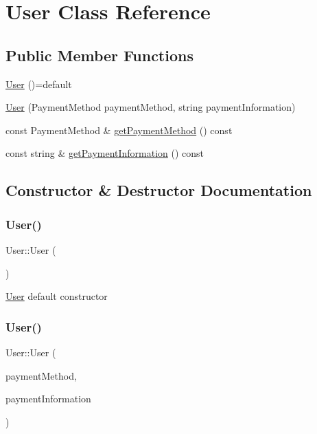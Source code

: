 \hypertarget{class_user}{}\section{User Class Reference}
\label{class_user}
\subsection*{Public Member Functions}
\begin{DoxyCompactItemize}
\item 
\mbox{\hyperlink{class_user_a4dd5fde1b81bb132994a67f27bc203d1}{User}} ()=default
\item 
\mbox{\hyperlink{class_user_ad4a962e2a4725118c5ea7a5af8362a66}{User}} (Payment\+Method payment\+Method, string payment\+Information)
\item 
const Payment\+Method \& \mbox{\hyperlink{class_user_a7945c31f5147c86e9577a8500ac51b8e}{get\+Payment\+Method}} () const
\item 
const string \& \mbox{\hyperlink{class_user_a815ed7790a21f851257aea04bbd43881}{get\+Payment\+Information}} () const
\end{DoxyCompactItemize}


\subsection{Constructor \& Destructor Documentation}
\mbox{\label{class_user_a4dd5fde1b81bb132994a67f27bc203d1}} 
\subsubsection{\texorpdfstring{User()}{User()}\hspace{0.1cm}{\footnotesize\ttfamily [1/2]}}
{\footnotesize\ttfamily User\+::\+User (\begin{DoxyParamCaption}{ }\end{DoxyParamCaption})\hspace{0.3cm}{\ttfamily [default]}}

\mbox{\hyperlink{class_user}{User}} default constructor \mbox{\label{class_user_ad4a962e2a4725118c5ea7a5af8362a66}} 
\subsubsection{\texorpdfstring{User()}{User()}\hspace{0.1cm}{\footnotesize\ttfamily [2/2]}}
{\footnotesize\ttfamily User\+::\+User (\begin{DoxyParamCaption}\item[{Payment\+Method}]{payment\+Method,  }\item[{string}]{payment\+Information }\end{DoxyParamCaption})}

